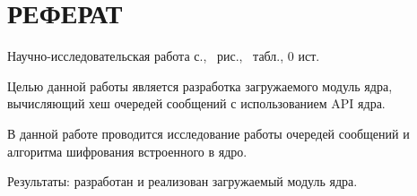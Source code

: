 \section*{\large РЕФЕРАТ}

Научно-исследовательская работа \pageref{LastPage} с., \totalfigures\ рис., \totaltables\ табл., 0 ист.


Целью данной работы является разработка загружаемого модуль ядра, вычисляющий хеш очередей сообщений с использованием API ядра.

В данной работе проводится исследование работы очередей сообщений и алгоритма шифрования встроенного в ядро.

Результаты: разработан и реализован загружаемый модуль ядра.


\pagebreak